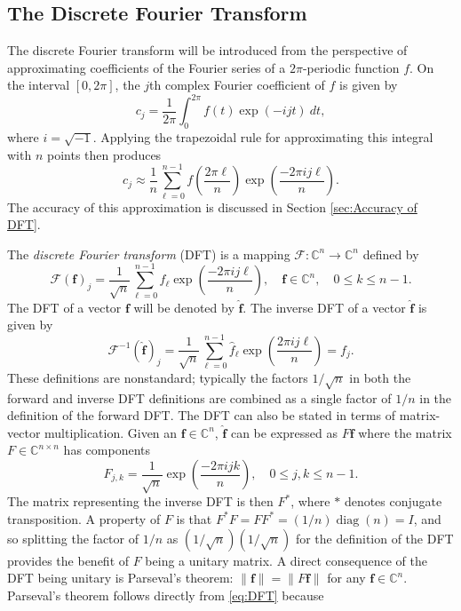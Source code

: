 \documentclass[12pt]{article}
\newcommand{\ctrans}{*}	%
\DeclareMathOperator{\diag}{diag}	%
\begin{document}
\subsection{The Discrete Fourier Transform} \label{sec:The Discrete Fourier Transform}
The discrete Fourier transform will be introduced from the perspective of approximating coefficients of the Fourier series of a $2\pi$-periodic function $f$. On the interval $[0,2\pi]$, the $j$th complex Fourier coefficient of $f$ is given by
\[c_j = \frac{1}{2\pi}\int_0^{2\pi} f(t)\exp(-ijt)\:dt,\]
where $i = \sqrt{-1}$.  Applying the trapezoidal rule for approximating this integral with $n$ points then produces
\[c_j \approx \frac{1}{n}\sum_{\ell = 0}^{n-1} f\left(\frac{2\pi{\ell}}{n}\right)\exp\left(\frac{-2\pi{ij\ell}}{n}\right).\]
The accuracy of this approximation is discussed in Section \ref{sec:Accuracy of DFT}. \par 
The \textit{discrete Fourier transform} (DFT) is a mapping $\mathcal{F}:\mathbb{C}^n \rightarrow \mathbb{C}^n$ defined by
\begin{equation}
\mathcal{F}(\mathbf{f})_j = \frac{1}{\sqrt{n}}\sum_{\ell=0}^{n-1} f_{\ell}\exp\left(\frac{-2\pi{ij\ell}}{n}\right), \quad \mathbf{f}\in\mathbb{C}^n, \quad 0 \leq k \leq n-1.
\label{eq:DFT}
\end{equation}
The DFT of a vector $\mathbf{f}$ will be denoted by $\widehat{\mathbf{f}}$. The inverse DFT of a vector $\widehat{\mathbf{f}}$ is given by
\begin{equation}
\mathcal{F}^{-1}(\widehat{\mathbf{f}})_j = \frac{1}{\sqrt{n}}\sum_{\ell=0}^{n-1} \widehat{f}_\ell\exp\left(\frac{2\pi{ij\ell}}{n}\right) = f_j.
\end{equation}
These definitions are nonstandard; typically the factors $1/\sqrt{n}$ in both the forward and inverse DFT definitions are combined as a single factor of $1/n$ in the definition of the forward DFT. The DFT can also be stated in terms of matrix-vector multiplication. Given an $\mathbf{f} \in \mathbb{C}^n$, $\widehat{\mathbf{f}}$ can be expressed as $F\mathbf{f}$ where the matrix $F\in\mathbb{C}^{n\times{n}}$ has components
\begin{equation}
F_{j,k} = \frac{1}{\sqrt{n}}\exp\left(\frac{-2\pi{ijk}}{n}\right), \quad 0 \leq j,k \leq n-1.
\label{eq:DFT-Matrix}
\end{equation}
The matrix representing the inverse DFT is then $F^\ctrans$, where $\ctrans$ denotes conjugate transposition. A property of $F$ is that $F^\ctrans F = FF^\ctrans = (1/n)\diag(n) = I$, and so splitting the factor of $1/n$ as $(1/\sqrt{n})(1/\sqrt{n})$ for the definition of the DFT provides the benefit of $F$ being a unitary matrix. A direct consequence of the DFT being unitary is Parseval's theorem: $\|\mathbf{f}\| = \|F\mathbf{f}\|$ for any $\mathbf{f} \in \mathbb{C}^n$. Parseval's theorem follows directly from \eqref{eq:DFT} because
\end{document}
